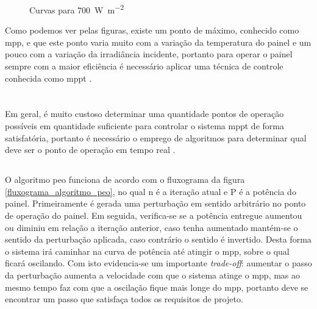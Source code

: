 \begin{figure}[!htpb]
\begin{center}
\caption[caption]{Curvas para \SI[per-mode=symbol]{700}{\watt\per\square\meter}}
\label{figura_comparacao_700}
\end{center}
\end{figure}

Como podemos ver pelas figuras, existe um ponto de máximo, conhecido como \gls{mpp}, e que este ponto varia muito com a variação da temperatura do painel e um pouco com a variação da irradiância incidente, portanto para operar o painel sempre com a maior eficiência é necessário aplicar uma técnica de controle conhecida como \gls{mppt} \cite{ahmed2016}.

\section{}

Em geral, é muito custoso determinar uma quantidade pontos de operação possíveis em quantidade suficiente para controlar o sistema \gls{mppt} de forma satisfatória, portanto é necessário o emprego de algoritmos para determinar qual deve ser o ponto de operação em tempo real \cite{al2016}.

\subsection{}

O algoritmo \gls{peo} funciona de acordo com o fluxograma da figura \ref{fluxograma_algoritmo_peo}, no qual n é a iteração atual e P é a potência do painel. Primeiramente é gerada uma perturbação em sentido arbitrário no ponto de operação do painel. Em seguida, verifica-se se a potência entregue aumentou ou diminiu em relação a iteração anterior, caso tenha aumentado mantém-se o sentido da perturbação aplicada, caso contrário o sentido é invertido. Desta forma o sistema irá caminhar na curva de potência até atingir o \gls{mpp}, sobre o qual ficará oscilando. Com isto evidencia-se um importante \textit{trade-off}: aumentar o passo da perturbação aumenta a velocidade com que o sistema atinge o \gls{mpp}, mas ao mesmo tempo faz com que a oscilação fique mais longe do \gls{mpp}, portanto deve se encontrar um passo que satisfaça todos os requisitos de projeto.

